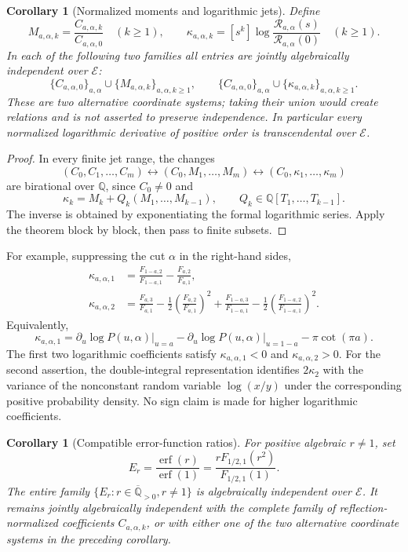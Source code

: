 \documentclass[11pt,a4paper]{article}
\newcommand{\Qbar}{\overline{\mathbb Q}}
\newcommand{\E}{\mathcal E}
\newtheorem{corollary}[theorem]{Corollary}
\theoremstyle{definition}
\theoremstyle{remark}
\numberwithin{equation}{section}
\begin{document}
\begin{corollary}[Normalized moments and logarithmic jets]\label{refl:cor:normalized-jets}
Define
\[
 M_{a,\alpha,k}=\frac{C_{a,\alpha,k}}{C_{a,\alpha,0}}
 \quad(k\geq1),\qquad
 \kappa_{a,\alpha,k}
 =[s^k]\log\frac{\mathcal R_{a,\alpha}(s)}
                         {\mathcal R_{a,\alpha}(0)}
 \quad(k\geq1).
\]
In each of the following two families all entries are jointly
algebraically independent over \(\E\):
\[
 \{C_{a,\alpha,0}\}_{a,\alpha}
 \cup\{M_{a,\alpha,k}\}_{a,\alpha,k\geq1},
 \qquad
 \{C_{a,\alpha,0}\}_{a,\alpha}
 \cup\{\kappa_{a,\alpha,k}\}_{a,\alpha,k\geq1}.
\]
These are two alternative coordinate systems; taking their union would
create relations and is not asserted to preserve independence.
In particular every normalized logarithmic derivative of positive order
is transcendental over \(\E\).
\end{corollary}

\begin{proof}
In every finite jet range, the changes
\[
 (C_0,C_1,\ldots,C_m)
 \longleftrightarrow (C_0,M_1,\ldots,M_m)
 \longleftrightarrow (C_0,\kappa_1,\ldots,\kappa_m)
\]
are birational over \(\mathbb Q\), since \(C_0\ne0\) and
\[
 \kappa_k=M_k+Q_k(M_1,\ldots,M_{k-1}),\qquad
 Q_k\in\mathbb Q[T_1,\ldots,T_{k-1}].
\]
The inverse is obtained by exponentiating the formal logarithmic series.
Apply the theorem block by block, then pass to finite subsets.
\end{proof}

For example, suppressing the cut \(\alpha\) in the right-hand sides,
\begin{align*}
 \kappa_{a,\alpha,1}
 &=\frac{F_{1-a,2}}{F_{1-a,1}}
   -\frac{F_{a,2}}{F_{a,1}},\\
 \kappa_{a,\alpha,2}
 &=\frac{F_{a,3}}{F_{a,1}}
   -\frac12\left(\frac{F_{a,2}}{F_{a,1}}\right)^2
   +\frac{F_{1-a,3}}{F_{1-a,1}}
   -\frac12\left(\frac{F_{1-a,2}}{F_{1-a,1}}\right)^2.
\end{align*}
Equivalently,
\[
 \kappa_{a,\alpha,1}
 =\left.\partial_u\log P(u,\alpha)\right|_{u=a}
  -\left.\partial_u\log P(u,\alpha)\right|_{u=1-a}
  -\pi\cot(\pi a).
\]
The first two logarithmic coefficients satisfy
\(\kappa_{a,\alpha,1}<0\) and \(\kappa_{a,\alpha,2}>0\).
For the second assertion, the double-integral representation identifies
\(2\kappa_2\) with the variance of the nonconstant random variable
\(\log(x/y)\) under the corresponding positive probability density.
No sign claim is made for higher logarithmic coefficients.

\begin{corollary}[Compatible error-function ratios]\label{refl:cor:erf-ratios}
For positive algebraic \(r\ne1\), set
\[
 E_r=\frac{\operatorname{erf}(r)}{\operatorname{erf}(1)}
    =\frac{rF_{1/2,1}(r^2)}{F_{1/2,1}(1)}.
\]
The entire family \(\{E_r:r\in\Qbar_{>0},r\ne1\}\)
is algebraically independent over \(\E\).
It remains jointly algebraically independent with the complete family
of reflection-normalized coefficients \(C_{a,\alpha,k}\), or with either
one of the two alternative coordinate systems in the preceding
corollary.
\end{corollary}
\end{document}
